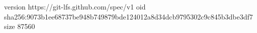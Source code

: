 version https://git-lfs.github.com/spec/v1
oid sha256:9073b1ee68737be948b749879bde124012a8d34dcb9795302c9c845b3dbe3df7
size 87560
